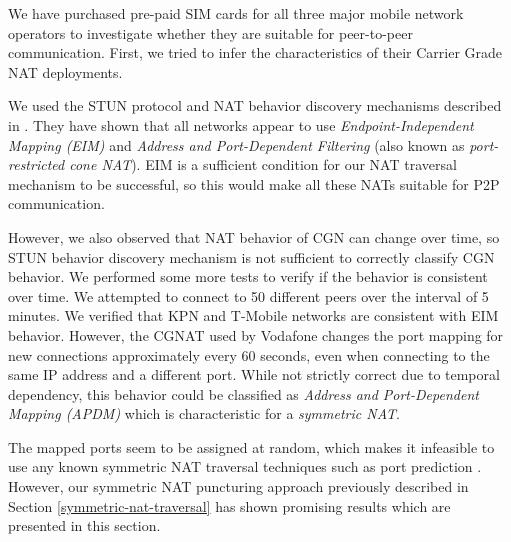 We have purchased pre-paid SIM cards for all three major mobile network operators to investigate whether they are suitable for peer-to-peer communication. First, we tried to infer the characteristics of their Carrier Grade NAT deployments.

We used the STUN protocol and NAT behavior discovery mechanisms described in \cite{rfc5780}. They have shown that all networks appear to use \textit{Endpoint-Independent Mapping (EIM)} and \textit{Address and Port-Dependent Filtering} (also known as \textit{port-restricted cone NAT}). EIM is a sufficient condition for our NAT traversal mechanism to be successful, so this would make all these NATs suitable for P2P communication.

However, we also observed that NAT behavior of CGN can change over time, so STUN behavior discovery mechanism is not sufficient to correctly classify CGN behavior. We performed some more tests to verify if the behavior is consistent over time. We attempted to connect to 50 different peers over the interval of 5 minutes. We verified that KPN and T-Mobile networks are consistent with EIM behavior. However, the CGNAT used by Vodafone changes the port mapping for new connections approximately every 60 seconds, even when connecting to the same IP address and a different port. While not strictly correct due to temporal dependency, this behavior could be classified as \textit{Address and Port-Dependent Mapping (APDM)} which is characteristic for a \textit{symmetric NAT}. %

The mapped ports seem to be assigned at random, which makes it infeasible to use any known symmetric NAT traversal techniques such as port prediction \cite{takeda}. However, our symmetric NAT puncturing approach previously described in Section \ref{symmetric-nat-traversal} has shown promising results which are presented in this section.

